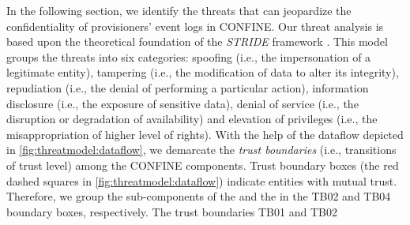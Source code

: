 \begin{newj}
	

In the following section, we identify the threats that can jeopardize the confidentiality of provisioners' event logs in CONFINE. Our threat analysis is based upon the theoretical foundation of the \textit{STRIDE} framework \cite{aa}. This model groups the threats into six categories: spoofing (i.e., the impersonation of a legitimate entity), tampering (i.e., the modification of data to alter its integrity), repudiation (i.e., the denial of performing a particular action), information disclosure (i.e., the exposure of sensitive data), denial of service (i.e., the disruption or degradation of availability) and elevation of privileges (i.e., the misappropriation of higher level of rights). With the help of the dataflow depicted in \cref{fig:threatmodel:dataflow}, we demarcate the \textit{trust boundaries} (i.e., transitions of trust level) among the CONFINE components. Trust boundary boxes (the red dashed squares in \cref{fig:threatmodel:dataflow}) indicate entities with mutual trust. Therefore, we group the sub-components of the  and the  in the TB02 and TB04 boundary boxes, respectively. The trust boundaries TB01 and TB02 

\end{newj}


